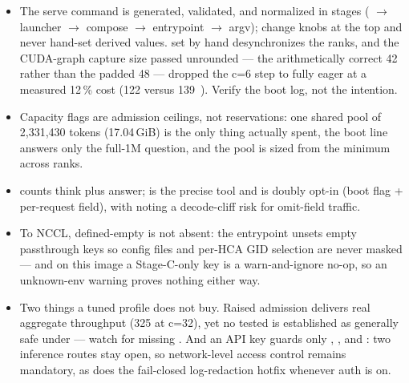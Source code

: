 \begin{itemize}
  \item The serve command is generated, validated, and normalized in stages
    ( $\rightarrow$ launcher $\rightarrow$ compose
    $\rightarrow$ entrypoint $\rightarrow$ argv); change knobs at the top and
    never hand-set derived values.  set by
    hand desynchronizes the ranks, and the CUDA-graph capture size passed
    unrounded --- the arithmetically correct 42 rather than the padded 48
    --- dropped the c=6 step to fully eager at a measured 12\,\% cost
    (122 versus 139~\tokspersec{}). Verify the boot log, not the intention.
  \item Capacity flags are admission ceilings, not reservations: one shared
    pool of 2{,}331{,}430 tokens (17.04\,GiB) is the only thing actually
    spent, the  boot line answers only the full-1M question, and
    the pool is sized from the minimum across ranks.
  \item {} counts think plus answer;
     is the precise tool and is doubly opt-in
    (boot flag  + per-request field), with  noting a
    decode-cliff risk for omit-field traffic.
  \item To NCCL, defined-empty is not absent: the entrypoint unsets empty
    passthrough keys so config files and per-HCA GID selection are never
    masked --- and on this image a Stage-C-only key is a warn-and-ignore
    no-op, so an unknown-env warning proves nothing either way.
  \item Two things a tuned profile does not buy. Raised admission delivers
    real aggregate throughput (325 \tokspersec{} at c=32), yet no tested
     is established as generally safe under
     --- watch for missing . And an API key
    guards only , , and : two inference
    routes stay open, so network-level access control remains mandatory, as
    does the fail-closed log-redaction hotfix whenever auth is on.
\end{itemize}

